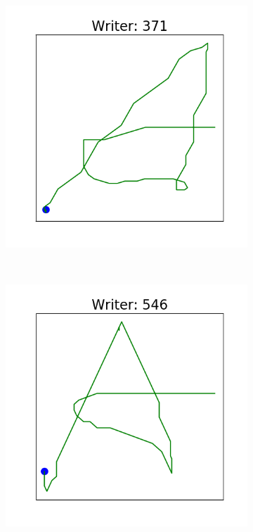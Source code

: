 \begin{figure}[!htbp]
\begin{subfigure}{0.45\textwidth}
      \end{subfigure}
      ~
      \begin{subfigure}{0.45\textwidth}
          \includegraphics[scale=0.50]{images/framework/A_371.png}
      \end{subfigure}
      ~
      \begin{subfigure}{0.45\textwidth}
          \includegraphics[scale=0.50]{images/framework/A_546.png}
      \end{subfigure}


\end{figure}
